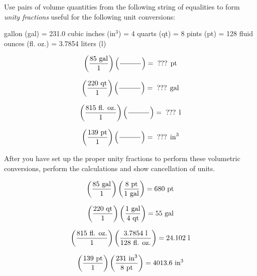 

Use pairs of volume quantities from the following string of equalities to form {\it unity fractions} useful for the following unit conversions:

\vskip 10pt

 gallon (gal) = 231.0 cubic inches (in$^{3}$) = 4 quarts (qt) = 8 pints (pt) = 128 fluid ounces (fl. oz.) = 3.7854 liters (l)

$$\left(85 \hbox{ gal} \over 1 \right) \left(\hbox{\hskip 30pt} \over \hbox{\hskip 30pt}\right) = \hbox{ ??? pt} $$

$$\left(220 \hbox{ qt} \over 1 \right) \left(\hbox{\hskip 30pt} \over \hbox{\hskip 30pt}\right) = \hbox{ ??? gal} $$

$$\left(815 \hbox{ fl. oz.} \over 1 \right) \left(\hbox{\hskip 30pt} \over \hbox{\hskip 30pt}\right) = \hbox{ ??? l} $$

$$\left(139 \hbox{ pt} \over 1 \right) \left(\hbox{\hskip 30pt} \over \hbox{\hskip 30pt}\right) = \hbox{ ??? in}^3 $$

After you have set up the proper unity fractions to perform these volumetric conversions, perform the calculations and show cancellation of units.








$$\left(85 \hbox{ gal} \over 1 \right) \left(8 \hbox{ pt} \over 1 \hbox{ gal}\right) = 680 \hbox{ pt} $$

$$\left(220 \hbox{ qt} \over 1 \right) \left(1 \hbox{ gal} \over 4 \hbox{ qt}\right) = 55 \hbox{ gal} $$

$$\left(815 \hbox{ fl. oz.} \over 1 \right) \left(3.7854 \hbox{ l} \over 128 \hbox{ fl. oz.}\right) = 24.102 \hbox{ l} $$

$$\left(139 \hbox{ pt} \over 1 \right) \left(231 \hbox{ in}^3 \over 8 \hbox{ pt}\right) = 4013.6 \hbox{ in}^3 $$











